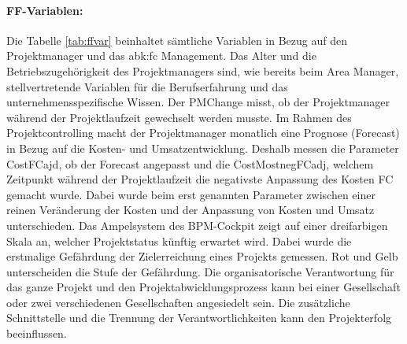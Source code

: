 \paragraph{FF-Variablen:}  Die Tabelle \ref{tab:ffvar} beinhaltet sämtliche  Variablen in Bezug auf den Projektmanager und das \gls{abk:fc} Management. Das Alter und die Betriebszugehörigkeit des Projektmanagers sind, wie bereits beim Area Manager, stellvertretende Variablen für die Berufserfahrung und das unternehmensspezifische Wissen. Der PMChange misst, ob der Projektmanager während der Projektlaufzeit gewechselt werden musste.
\newline Im Rahmen des Projektcontrolling macht der Projektmanager monatlich eine Prognose (Forecast) in Bezug auf die Kosten- und Umsatzentwicklung. Deshalb messen die Parameter CostFCajd, ob der Forecast angepasst und die CostMostnegFCadj, welchem Zeitpunkt während der Projektlaufzeit die negativste Anpassung des Kosten FC gemacht wurde. Dabei wurde beim erst genannten Parameter zwischen einer reinen Veränderung der Kosten und der Anpassung von Kosten und Umsatz unterschieden. Das Ampelsystem des BPM-Cockpit zeigt auf einer dreifarbigen Skala an, welcher Projektstatus künftig erwartet wird. Dabei wurde die erstmalige Gefährdung der Zielerreichung eines Projekts gemessen. Rot und Gelb unterscheiden die Stufe der Gefährdung. Die organisatorische Verantwortung für das ganze Projekt und den Projektabwicklungsprozess kann bei einer Gesellschaft oder zwei verschiedenen Gesellschaften angesiedelt sein. Die zusätzliche Schnittstelle und die Trennung der Verantwortlichkeiten kann den Projekterfolg beeinflussen.
